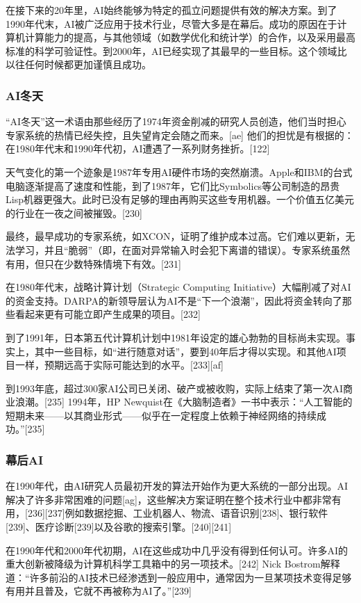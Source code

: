 在接下来的20年里，AI始终能够为特定的孤立问题提供有效的解决方案。到了1990年代末，AI被广泛应用于技术行业，尽管大多是在幕后。成功的原因在于计算机计算能力的提高，与其他领域（如数学优化和统计学）的合作，以及采用最高标准的科学可验证性。到2000年，AI已经实现了其最早的一些目标。这个领域比以往任何时候都更加谨慎且成功。
\subsubsection{AI冬天}  
“AI冬天”这一术语由那些经历了1974年资金削减的研究人员创造，他们当时担心专家系统的热情已经失控，且失望肯定会随之而来。[ae] 他们的担忧是有根据的：在1980年代末和1990年代初，AI遭遇了一系列财务挫折。[122]

天气变化的第一个迹象是1987年专用AI硬件市场的突然崩溃。Apple和IBM的台式电脑逐渐提高了速度和性能，到了1987年，它们比Symbolics等公司制造的昂贵Lisp机器更强大。此时已没有足够的理由再购买这些专用机器。一个价值五亿美元的行业在一夜之间被摧毁。[230]

最终，最早成功的专家系统，如XCON，证明了维护成本过高。它们难以更新，无法学习，并且“脆弱”（即，在面对异常输入时会犯下离谱的错误）。专家系统虽然有用，但只在少数特殊情境下有效。[231]

在1980年代末，战略计算计划（Strategic Computing Initiative）大幅削减了对AI的资金支持。DARPA的新领导层认为AI不是“下一个浪潮”，因此将资金转向了那些看起来更有可能立即产生成果的项目。[232]

到了1991年，日本第五代计算机计划中1981年设定的雄心勃勃的目标尚未实现。事实上，其中一些目标，如“进行随意对话”，要到40年后才得以实现。和其他AI项目一样，预期远高于实际可能达到的水平。[233][af]

到1993年底，超过300家AI公司已关闭、破产或被收购，实际上结束了第一次AI商业浪潮。[235] 1994年，HP Newquist在《大脑制造者》一书中表示：“人工智能的短期未来——以其商业形式——似乎在一定程度上依赖于神经网络的持续成功。”[235]
\subsubsection{幕后AI}  
在1990年代，由AI研究人员最初开发的算法开始作为更大系统的一部分出现。AI解决了许多非常困难的问题[ag]，这些解决方案证明在整个技术行业中都非常有用，[236][237]例如数据挖掘、工业机器人、物流、语音识别[238]、银行软件[239]、医疗诊断[239]以及谷歌的搜索引擎。[240][241]

在1990年代和2000年代初期，AI在这些成功中几乎没有得到任何认可。许多AI的重大创新被降级为计算机科学工具箱中的另一项技术。[242] Nick Bostrom解释道：“许多前沿的AI技术已经渗透到一般应用中，通常因为一旦某项技术变得足够有用并且普及，它就不再被称为AI了。”[239]

